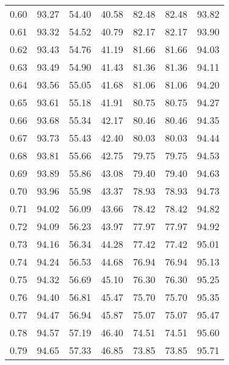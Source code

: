 \begin{tabular}{|c|c|c|c|c|c|c|}
      0.60 &     93.27 &     54.40 &      40.58 &   82.48 &      82.48 &         93.82 \\
      0.61 &     93.32 &     54.52 &      40.79 &   82.17 &      82.17 &         93.90 \\
      0.62 &     93.43 &     54.76 &      41.19 &   81.66 &      81.66 &         94.03 \\
      0.63 &     93.49 &     54.90 &      41.43 &   81.36 &      81.36 &         94.11 \\
      0.64 &     93.56 &     55.05 &      41.68 &   81.06 &      81.06 &         94.20 \\
      0.65 &     93.61 &     55.18 &      41.91 &   80.75 &      80.75 &         94.27 \\
      0.66 &     93.68 &     55.34 &      42.17 &   80.46 &      80.46 &         94.35 \\
      0.67 &     93.73 &     55.43 &      42.40 &   80.03 &      80.03 &         94.44 \\
      0.68 &     93.81 &     55.66 &      42.75 &   79.75 &      79.75 &         94.53 \\
      0.69 &     93.89 &     55.86 &      43.08 &   79.40 &      79.40 &         94.63 \\
      0.70 &     93.96 &     55.98 &      43.37 &   78.93 &      78.93 &         94.73 \\
      0.71 &     94.02 &     56.09 &      43.66 &   78.42 &      78.42 &         94.82 \\
      0.72 &     94.09 &     56.23 &      43.97 &   77.97 &      77.97 &         94.92 \\
      0.73 &     94.16 &     56.34 &      44.28 &   77.42 &      77.42 &         95.01 \\
      0.74 &     94.24 &     56.53 &      44.68 &   76.94 &      76.94 &         95.13 \\
      0.75 &     94.32 &     56.69 &      45.10 &   76.30 &      76.30 &         95.25 \\
      0.76 &     94.40 &     56.81 &      45.47 &   75.70 &      75.70 &         95.35 \\
      0.77 &     94.47 &     56.94 &      45.87 &   75.07 &      75.07 &         95.47 \\
      0.78 &     94.57 &     57.19 &      46.40 &   74.51 &      74.51 &         95.60 \\
      0.79 &     94.65 &     57.33 &      46.85 &   73.85 &      73.85 &         95.71 \\

\end{tabular}
